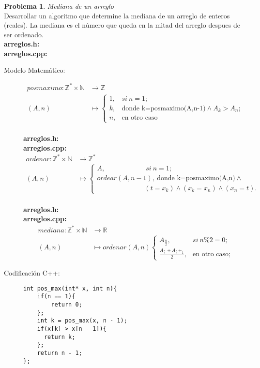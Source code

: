 \documentclass{article}
\theoremstyle{plain}
\theoremstyle{definition}
\newtheorem{problem}{Problema}
\begin{document}
\begin{problem} \emph{Mediana de un arreglo}\\
Desarrollar un algoritmo que determine la mediana de un arreglo de enteros (reales).  La mediana es el número que queda en la mitad del arreglo despues de ser ordenado.\\
\textbf{arreglos.h:}\ \\
\textbf{arreglos.cpp:}\ 
%
\begin{description}
\item[Modelo Matemático:]
%
\begin{align*}
posmaximo: \mathbb{Z}^*\times\mathbb{N} &\to \mathbb{Z}\\
(A,n) &\mapsto
\begin{cases}
1,& si\ n=1;\\
k,& \text{donde k=posmaximo(A,n-1)}\wedge A_k>A_n;\\
n,& \text{en otro caso}
\end{cases}
\end{align*}\\
\textbf{arreglos.h:}\ \\
\textbf{arreglos.cpp:}\ 
\begin{align*}
ordenar: \mathbb{Z}^*\times\mathbb{N} &\to \mathbb{Z}^*\\
(A,n) &\mapsto
\begin{cases}
A,\quad\quad\quad\quad\quad\quad si\ n=1;\\
ordear(A,n-1),\ \text{donde k=posmaximo(A,n)}\wedge\\
\quad\quad\quad\quad\quad\quad\quad(t = x_k) \wedge (x_k = x_n) \wedge (x_n = t).
\end{cases}
\end{align*}\\
\textbf{arreglos.h:}\ \\
\textbf{arreglos.cpp:}\ 
\begin{align*}
mediana:\mathbb{Z}^*\times\mathbb{N} &\to \mathbb{R}\\
(A,n) &\mapsto ordenar(A,n)
\begin{cases}
A_\frac{n}{2},& si\ n\%2=0;\\
\frac{A_\frac{n}{2}+A_\frac{n}{2}+_1}{2},& \text{en otro caso;}
\end{cases}
\end{align*}
%
\item[Codificación \textsf{C++}:]\hfill
%
\begin{verbatim}
int pos_max(int* x, int n){
    if(n == 1){
        return 0;
    };
    int k = pos_max(x, n - 1);
    if(x[k] > x[n - 1]){
      return k;
    };
    return n - 1;
};


\end{verbatim}
\end{description}
\end{problem}
\end{document}
